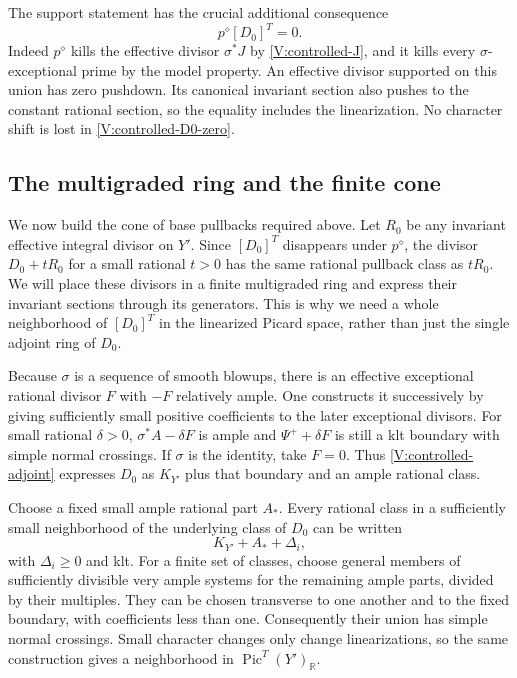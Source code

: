 The support statement has the crucial additional consequence
\begin{equation}\label{V:controlled-D0-zero}
 p^\diamond[D_0]^T=0.
\end{equation}
Indeed $p^\diamond$ kills the effective divisor $\sigma^*J$ by
\eqref{V:controlled-J}, and it kills every $\sigma$-exceptional prime
by the model property.  An effective divisor supported on this union
has zero pushdown.  Its canonical invariant section also pushes to the
constant rational section, so the equality includes the linearization.
No character shift is lost in \eqref{V:controlled-D0-zero}.

\subsection{The multigraded ring and the finite cone}

We now build the cone of base pullbacks required above.  Let $R_0$
be any invariant effective integral divisor on $Y'$.  Since $[D_0]^T$
disappears under $p^\diamond$, the divisor $D_0+tR_0$ for a small
rational $t>0$ has the same rational pullback class as $tR_0$.
We will place these divisors in a finite multigraded ring and express
their invariant sections through its generators.  This is why we need
a whole neighborhood of $[D_0]^T$ in the linearized Picard space,
rather than just the single adjoint ring of $D_0$.

Because $\sigma$ is a sequence of smooth blowups, there is an effective
exceptional rational divisor $F$ with $-F$ relatively ample.  One
constructs it successively by giving sufficiently small positive
coefficients to the later exceptional divisors.  For small rational
$\delta>0$, $\sigma^*A-\delta F$ is ample and
$\Psi^++\delta F$ is still a klt boundary with simple normal
crossings.  If $\sigma$ is the identity, take $F=0$.  Thus
\eqref{V:controlled-adjoint} expresses $D_0$ as $K_{Y'}$ plus that
boundary and an ample rational class.

Choose a fixed small ample rational part $A_*$.  Every rational class
in a sufficiently small neighborhood of the underlying class of $D_0$
can be written
\[
 K_{Y'}+A_*+\Delta_i,
\]
with $\Delta_i\ge0$ and klt.  For a finite set of classes, choose
general members of sufficiently divisible very ample systems for the
remaining ample parts, divided by their multiples.  They can be chosen
transverse to one another and to the fixed boundary, with coefficients
less than one.  Consequently their union has simple normal crossings.
Small character changes only change linearizations, so the same
construction gives a neighborhood in
$\operatorname{Pic}^T(Y')_{\mathbb R}$.

